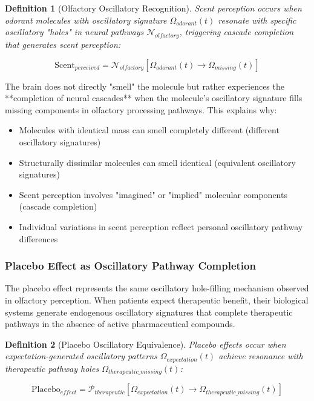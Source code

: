 \documentclass[12pt,a4paper]{article}
\newtheorem{definition}{Definition}[section]
\begin{document}
\begin{definition}[Olfactory Oscillatory Recognition]
Scent perception occurs when odorant molecules with oscillatory signature $\Omega_{odorant}(t)$ resonate with specific oscillatory "holes" in neural pathways $\mathcal{N}_{olfactory}$, triggering cascade completion that generates scent perception:

\begin{equation}
\text{Scent}_{perceived} = \mathcal{N}_{olfactory}[\Omega_{odorant}(t) \rightarrow \Omega_{missing}(t)]
\end{equation}
\end{definition}

The brain does not directly "smell" the molecule but rather experiences the **completion of neural cascades** when the molecule's oscillatory signature fills missing components in olfactory processing pathways. This explains why:

\begin{itemize}
\item Molecules with identical mass can smell completely different (different oscillatory signatures)
\item Structurally dissimilar molecules can smell identical (equivalent oscillatory signatures)
\item Scent perception involves "imagined" or "implied" molecular components (cascade completion)
\item Individual variations in scent perception reflect personal oscillatory pathway differences
\end{itemize}

\subsubsection{Placebo Effect as Oscillatory Pathway Completion}

The placebo effect represents the same oscillatory hole-filling mechanism observed in olfactory perception. When patients expect therapeutic benefit, their biological systems generate endogenous oscillatory signatures that complete therapeutic pathways in the absence of active pharmaceutical compounds.

\begin{definition}[Placebo Oscillatory Equivalence]
Placebo effects occur when expectation-generated oscillatory patterns $\Omega_{expectation}(t)$ achieve resonance with therapeutic pathway holes $\Omega_{therapeutic\_missing}(t)$:

\begin{equation}
\text{Placebo}_{effect} = \mathcal{P}_{therapeutic}[\Omega_{expectation}(t) \rightarrow \Omega_{therapeutic\_missing}(t)]
\end{equation}
\end{definition}
\end{document}
